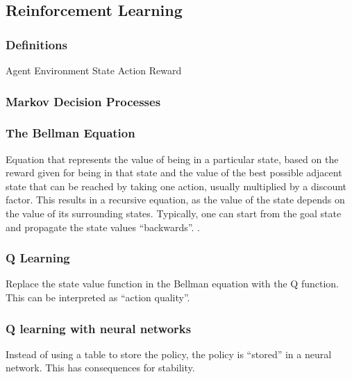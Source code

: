 \subsection{Reinforcement Learning}
\subsubsection{Definitions}
Agent
Environment
State
Action
Reward

\subsubsection{Markov Decision Processes}

\subsubsection{The Bellman Equation}
Equation that represents the value of being in a particular state,
based on the reward given for being in that state and the value of the
best possible adjacent state that can be reached by taking one action,
usually multiplied by a discount factor. This results in a recursive
equation, as the value of the state depends on the value of its
surrounding states. Typically, one can start from the goal state and
propagate the state values ``backwards''. .

\subsubsection{Q Learning}
Replace the state value function in the Bellman equation with the Q
function. This can be interpreted as ``action quality''.

\subsubsection{Q learning with neural networks}
Instead of using a table to store the policy, the policy is ``stored''
in a neural network. This has consequences for stability.

